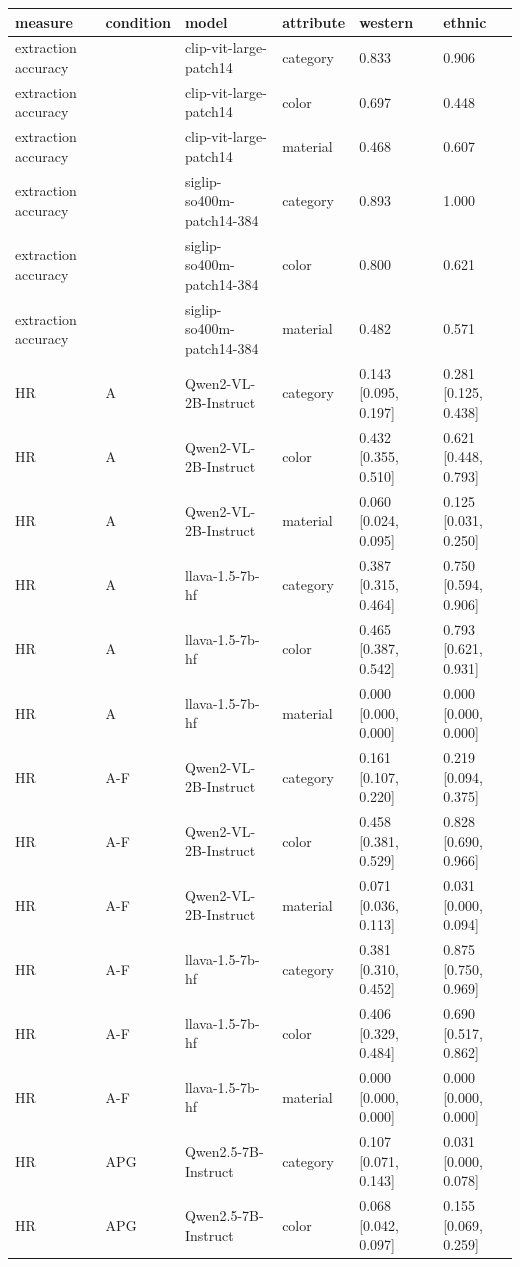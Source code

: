 \begin{tabular}{llllll}
\toprule
measure & condition & model & attribute & western & ethnic \\
\midrule
extraction accuracy &  & clip-vit-large-patch14 & category & 0.833 & 0.906 \\
extraction accuracy &  & clip-vit-large-patch14 & color & 0.697 & 0.448 \\
extraction accuracy &  & clip-vit-large-patch14 & material & 0.468 & 0.607 \\
extraction accuracy &  & siglip-so400m-patch14-384 & category & 0.893 & 1.000 \\
extraction accuracy &  & siglip-so400m-patch14-384 & color & 0.800 & 0.621 \\
extraction accuracy &  & siglip-so400m-patch14-384 & material & 0.482 & 0.571 \\
HR & A & Qwen2-VL-2B-Instruct & category & 0.143 [0.095, 0.197] & 0.281 [0.125, 0.438] \\
HR & A & Qwen2-VL-2B-Instruct & color & 0.432 [0.355, 0.510] & 0.621 [0.448, 0.793] \\
HR & A & Qwen2-VL-2B-Instruct & material & 0.060 [0.024, 0.095] & 0.125 [0.031, 0.250] \\
HR & A & llava-1.5-7b-hf & category & 0.387 [0.315, 0.464] & 0.750 [0.594, 0.906] \\
HR & A & llava-1.5-7b-hf & color & 0.465 [0.387, 0.542] & 0.793 [0.621, 0.931] \\
HR & A & llava-1.5-7b-hf & material & 0.000 [0.000, 0.000] & 0.000 [0.000, 0.000] \\
HR & A-F & Qwen2-VL-2B-Instruct & category & 0.161 [0.107, 0.220] & 0.219 [0.094, 0.375] \\
HR & A-F & Qwen2-VL-2B-Instruct & color & 0.458 [0.381, 0.529] & 0.828 [0.690, 0.966] \\
HR & A-F & Qwen2-VL-2B-Instruct & material & 0.071 [0.036, 0.113] & 0.031 [0.000, 0.094] \\
HR & A-F & llava-1.5-7b-hf & category & 0.381 [0.310, 0.452] & 0.875 [0.750, 0.969] \\
HR & A-F & llava-1.5-7b-hf & color & 0.406 [0.329, 0.484] & 0.690 [0.517, 0.862] \\
HR & A-F & llava-1.5-7b-hf & material & 0.000 [0.000, 0.000] & 0.000 [0.000, 0.000] \\
HR & APG & Qwen2.5-7B-Instruct & category & 0.107 [0.071, 0.143] & 0.031 [0.000, 0.078] \\
HR & APG & Qwen2.5-7B-Instruct & color & 0.068 [0.042, 0.097] & 0.155 [0.069, 0.259] \\

\end{tabular}
